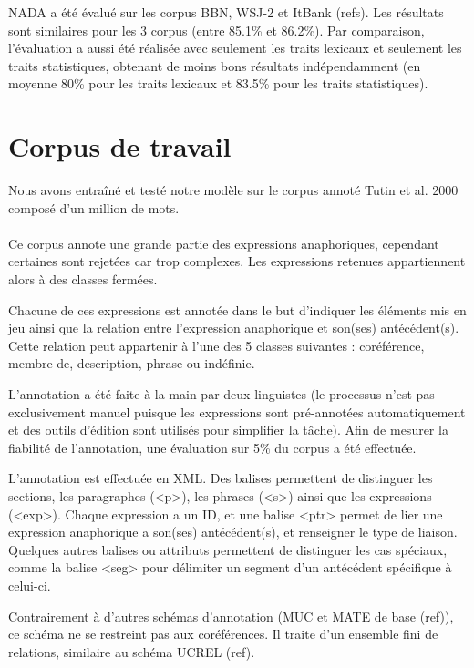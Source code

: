 \documentclass[a4paper,12pt]{article}
\begin{document}
NADA a été évalué sur les corpus BBN, WSJ-2 et ItBank (refs). Les résultats sont similaires pour les 3 corpus (entre 85.1\% et 86.2\%). Par comparaison, l'évaluation a aussi été réalisée avec seulement les traits lexicaux et seulement les traits statistiques, obtenant de moins bons résultats indépendamment (en moyenne 80\% pour les traits lexicaux et 83.5\% pour les traits statistiques).

\section{Corpus de travail}

Nous avons entraîné et testé notre modèle sur le corpus annoté Tutin et al. 2000 composé d'un million de mots.

\paragraph{}
Ce corpus annote une grande partie des expressions anaphoriques, cependant certaines sont rejetées car trop complexes. Les expressions retenues appartiennent alors à des classes fermées.

Chacune de ces expressions est annotée dans le but d'indiquer les éléments mis en jeu ainsi que la relation entre l'expression anaphorique et son(ses) antécédent(s). Cette relation peut appartenir à l'une des 5 classes suivantes : coréférence, membre de, description, phrase ou indéfinie.

L'annotation a été faite à la main par deux linguistes (le processus n'est pas exclusivement manuel puisque les expressions sont pré-annotées automatiquement et des outils d'édition sont utilisés pour simplifier la tâche). Afin de mesurer la fiabilité de l'annotation, une évaluation sur 5\% du corpus a été effectuée.

L'annotation est effectuée en XML. Des balises permettent de distinguer les sections, les paragraphes (<p>), les phrases (<s>) ainsi que les expressions (<exp>). Chaque expression a un ID, et une balise <ptr> permet de lier une expression anaphorique a son(ses) antécédent(s), et renseigner le type de liaison. Quelques autres balises ou attributs permettent de distinguer les cas spéciaux, comme la balise <seg> pour délimiter un segment d'un antécédent spécifique à celui-ci.

Contrairement à d'autres schémas d'annotation (MUC et MATE de base (ref)), ce schéma ne se restreint pas aux coréférences. Il traite d'un ensemble fini de relations, similaire au schéma UCREL (ref).
\end{document}
